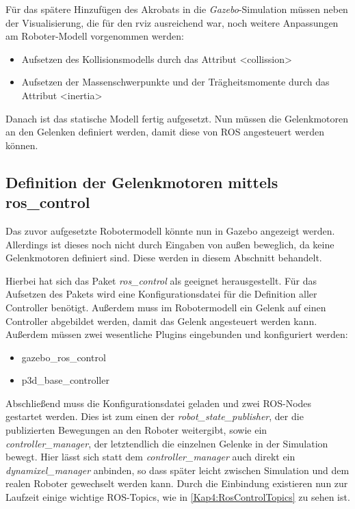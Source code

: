 Für das spätere Hinzufügen des Akrobats in die \emph{Gazebo}-Simulation müssen neben der Visualisierung, die für den rviz ausreichend war, noch weitere Anpassungen am Roboter-Modell vorgenommen werden:
\begin{itemize}
  \item Aufsetzen des Kollisionsmodells durch das Attribut <collission>
  \item Aufsetzen der Massenschwerpunkte und der Trägheitsmomente durch das Attribut <inertia>
\end{itemize}

Danach ist das statische Modell fertig aufgesetzt. Nun müssen die Gelenkmotoren an den Gelenken definiert werden, damit diese von \ac{ROS} angesteuert werden können.

\subsection{Definition der Gelenkmotoren mittels ros\_control}

Das zuvor aufgesetzte Robotermodell könnte nun in Gazebo angezeigt werden. Allerdings ist dieses noch nicht durch Eingaben von außen beweglich, da keine Gelenkmotoren definiert sind. Diese werden in diesem Abschnitt behandelt.

Hierbei hat sich das Paket \emph{ros\_control} als geeignet herausgestellt. Für das Aufsetzen des Pakets wird eine Konfigurationsdatei für die Definition aller Controller benötigt. Außerdem muss im Robotermodell ein Gelenk auf einen Controller abgebildet werden, damit das Gelenk angesteuert werden kann. Außerdem müssen zwei wesentliche Plugins eingebunden und konfiguriert werden:
\begin{itemize}
  \item gazebo\_ros\_control
  \item p3d\_base\_controller
\end{itemize}

Abschließend muss die Konfigurationsdatei geladen und zwei \ac{ROS}-Nodes gestartet werden. Dies ist zum einen der \emph{robot\_state\_publisher}, der die publizierten Bewegungen an den Roboter weitergibt, sowie ein \emph{controller\_manager}, der letztendlich die einzelnen Gelenke in der Simulation bewegt. Hier lässt sich statt dem \emph{controller\_manager} auch direkt ein \emph{dynamixel\_manager} anbinden, so dass später leicht zwischen Simulation und dem realen Roboter gewechselt werden kann. Durch die Einbindung existieren nun zur Laufzeit einige wichtige \ac{ROS}-Topics, wie in \autoref{Kap4:RosControlTopics} zu sehen ist.

